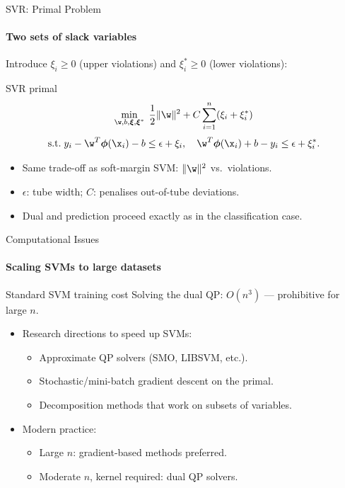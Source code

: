 \begin{frame}{SVR: Primal Problem}
  \framesubtitle{Two sets of slack variables}
  Introduce $\xi_i \ge 0$ (upper violations) and $\xi_i^* \ge 0$ (lower violations):
  \begin{block}{SVR primal}
    \[
      \min_{\w,b,\boldsymbol{\xi},\boldsymbol{\xi}^*} \;\frac{1}{2}\|\w\|^2 +
      C\sum_{i=1}^n (\xi_i + \xi_i^*)
    \]
    \[
      \text{s.t.}\; y_i - \w^T\boldsymbol{\phi}(\x_i) - b \le \epsilon + \xi_i,\quad
      \w^T\boldsymbol{\phi}(\x_i)+b - y_i \le \epsilon + \xi_i^*.
    \]
  \end{block}
  \begin{itemize}
    \item Same trade-off as soft-margin SVM: $\|\w\|^2$ vs.\ violations.
    \item $\epsilon$: tube width; $C$: penalises out-of-tube deviations.
    \item Dual and prediction proceed exactly as in the classification case.
  \end{itemize}
\end{frame}

\begin{frame}{Computational Issues}
  \framesubtitle{Scaling SVMs to large datasets}
  \begin{alertblock}{Standard SVM training cost}
    Solving the dual QP: $O(n^3)$ — \alert{prohibitive} for large $n$.
  \end{alertblock}
  \vspace{0.4em}
  \begin{itemize}
    \item Research directions to speed up SVMs:
      \begin{itemize}
        \item \alert{Approximate QP solvers} (SMO, LIBSVM, etc.).
        \item \alert{Stochastic/mini-batch gradient descent} on the primal.
        \item Decomposition methods that work on subsets of variables.
      \end{itemize}
    \item Modern practice:
      \begin{itemize}
        \item Large $n$: gradient-based methods preferred.
        \item Moderate $n$, kernel required: dual QP solvers.
      \end{itemize}
  \end{itemize}
\end{frame}

